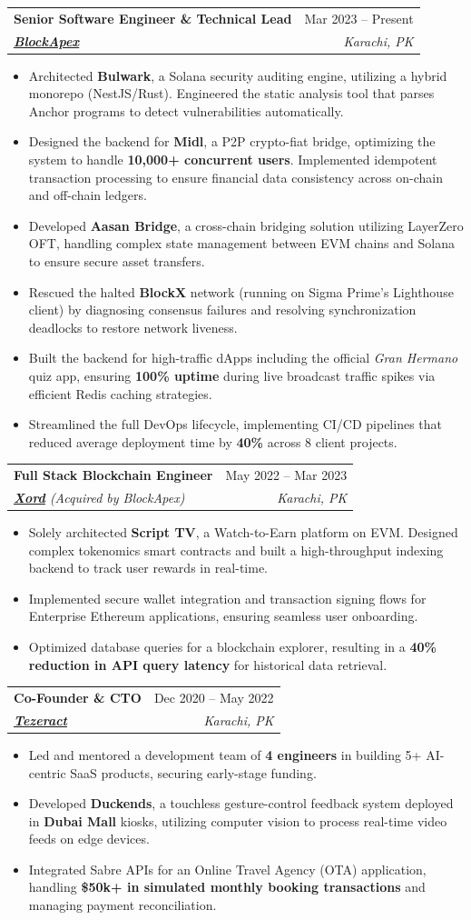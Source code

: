 \documentclass[letterpaper,11pt]{article}
\makeatletter
\newcommand{\resumeItem}[1]{
  \item\small{
    {#1 \vspace{-2pt}}
  }
}
\newcommand{\resumeSubheading}[4]{
  \vspace{-2pt}\item
    \begin{tabular*}{0.97\textwidth}[t]{l@{\extracolsep{\fill}}r}
      \textbf{#1} & #2 \\
      \textit{\small#3} & \textit{\small #4} \\
    \end{tabular*}\vspace{-7pt}
}
\newcommand{\resumeItemListStart}{\begin{itemize}}
\newcommand{\resumeItemListEnd}{\end{itemize}\vspace{-5pt}}
\makeatother
\begin{document}
    \resumeSubheading
      {Senior Software Engineer \& Technical Lead}{Mar 2023 -- Present}
      {\href{https://blockapex.io/}{\textbf{BlockApex}}}{Karachi, PK}
      \resumeItemListStart
        \resumeItem{Architected \textbf{Bulwark}, a Solana security auditing engine, utilizing a hybrid monorepo (NestJS/Rust). Engineered the static analysis tool that parses Anchor programs to detect vulnerabilities automatically.}
        \resumeItem{Designed the backend for \textbf{Midl}, a P2P crypto-fiat bridge, optimizing the system to handle \textbf{10,000+ concurrent users}. Implemented idempotent transaction processing to ensure financial data consistency across on-chain and off-chain ledgers.}
        \resumeItem{Developed \textbf{Aasan Bridge}, a cross-chain bridging solution utilizing LayerZero OFT, handling complex state management between EVM chains and Solana to ensure secure asset transfers.}
        \resumeItem{Rescued the halted \textbf{BlockX} network (running on Sigma Prime’s Lighthouse client) by diagnosing consensus failures and resolving synchronization deadlocks to restore network liveness.}
        \resumeItem{Built the backend for high-traffic dApps including the official \textit{Gran Hermano} quiz app, ensuring \textbf{100\% uptime} during live broadcast traffic spikes via efficient Redis caching strategies.}
        \resumeItem{Streamlined the full DevOps lifecycle, implementing CI/CD pipelines that reduced average deployment time by \textbf{40\%} across 8 client projects.}
      \resumeItemListEnd

    \resumeSubheading
      {Full Stack Blockchain Engineer}{May 2022 -- Mar 2023}
      {\href{https://xord.com/}{\textbf{Xord}} (Acquired by BlockApex)}{Karachi, PK}
      \resumeItemListStart
        \resumeItem{Solely architected \textbf{Script TV}, a Watch-to-Earn platform on EVM. Designed complex tokenomics smart contracts and built a high-throughput indexing backend to track user rewards in real-time.}
        \resumeItem{Implemented secure wallet integration and transaction signing flows for Enterprise Ethereum applications, ensuring seamless user onboarding.}
        \resumeItem{Optimized database queries for a blockchain explorer, resulting in a \textbf{40\% reduction in API query latency} for historical data retrieval.}
      \resumeItemListEnd

    \resumeSubheading
      {Co-Founder \& CTO}{Dec 2020 -- May 2022}
      {\href{https://tezeract.ai/}{\textbf{Tezeract}}}{Karachi, PK}
      \resumeItemListStart
        \resumeItem{Led and mentored a development team of \textbf{4 engineers} in building 5+ AI-centric SaaS products, securing early-stage funding.}
        \resumeItem{Developed \textbf{Duckends}, a touchless gesture-control feedback system deployed in \textbf{Dubai Mall} kiosks, utilizing computer vision to process real-time video feeds on edge devices.}
        \resumeItem{Integrated Sabre APIs for an Online Travel Agency (OTA) application, handling \textbf{\$50k+ in simulated monthly booking transactions} and managing payment reconciliation.}
      \resumeItemListEnd
\end{document}
